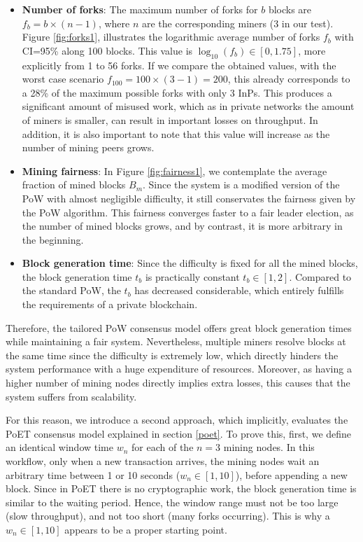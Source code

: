 \begin{itemize}
\item \textbf{Number of forks}: The maximum number of forks for $b$ blocks are $f_b = b \times (n-1)$, where $n$ are the corresponding miners (3 in our test). Figure \ref{fig:forks1}, illustrates the logarithmic average number of forks $f_b$ with CI=95\% along 100 blocks. This value is $\log_{10}(f_b) \in [0,1.75]$, more explicitly from 1 to 56 forks. If we compare the obtained values, with the worst case scenario $f_{100} = 100 \times (3-1) = 200$, this already corresponds to a 28\% of the maximum possible forks with only 3 InPs. This produces a significant amount of misused work, which as in private networks the amount of miners is smaller, can result in important losses on throughput. In addition, it is also important to note that this value will increase as the number of mining peers grows.
\item \textbf{Mining fairness}: In Figure \ref{fig:fairness1}, we contemplate the average fraction of mined blocks $B_m$. Since the system is a modified version of the PoW with almost negligible difficulty, it still conservates the fairness given by the PoW algorithm. This fairness converges faster to a fair leader election, as the number of mined blocks grows, and by contrast, it is more arbitrary in the beginning.
\item \textbf{Block generation time}: Since the difficulty is fixed for all the mined blocks, the block generation time $t_b$ is practically constant $t_b \in [1,2]$. Compared to the standard PoW, the $t_b$ has decreased considerable, which entirely fulfills the requirements of a private blockchain.
 
\end{itemize}

Therefore, the tailored PoW consensus model offers great block generation times while maintaining a fair system. Nevertheless, multiple miners resolve blocks at the same time since the difficulty is extremely low, which directly hinders the system performance with a huge expenditure of resources. Moreover, as having a higher number of mining nodes directly implies extra losses, this causes that the system suffers from scalability. 

For this reason, we introduce a second approach, which implicitly, evaluates the PoET consensus model explained in section \ref{poet}. To prove this, first, we define an identical window time $w_n$ for each of the $n = 3$ mining nodes. In this workflow, only when a new transaction arrives, the mining nodes wait an arbitrary time between 1 or 10 seconds ($w_n \in [1,10]$), before appending a new block. Since in PoET there is no cryptographic work, the block generation time is similar to the waiting period. Hence, the window range must not be too large (slow throughput), and not too short (many forks occurring). This is why a $w_n \in [1,10]$ appears to be a proper starting point. 

